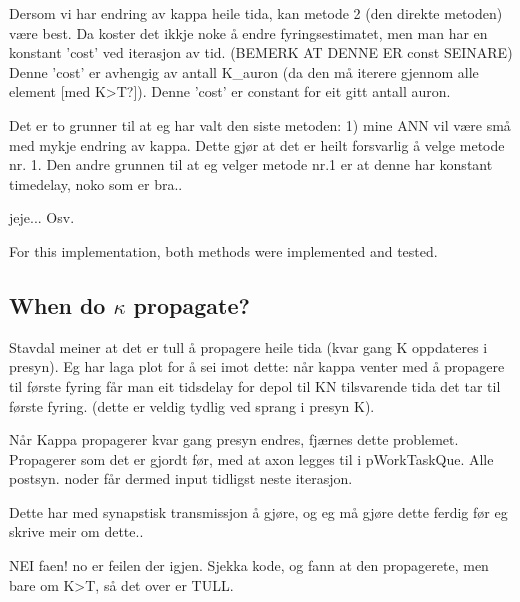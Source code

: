 	Dersom vi har endring av kappa heile tida, kan metode 2 (den direkte metoden) være best.
	Da koster det ikkje noke å endre fyringsestimatet, men man har en konstant 'cost' ved iterasjon av tid. (BEMERK AT DENNE ER const SEINARE)
	Denne 'cost' er avhengig av antall K\_auron (da den må iterere gjennom alle element [med K>T?]). Denne 'cost' er constant for eit gitt antall auron.

	Det er to grunner til at eg har valt den siste metoden: 1) mine ANN vil være små med mykje endring av kappa. Dette gjør at det er heilt forsvarlig å velge metode nr. 1.
	Den andre grunnen til at eg velger metode nr.1 er at denne har konstant timedelay, noko som er bra..

	jeje... Osv.

	For this implementation, both methods were implemented and tested. 












\subsection{When do $\kappa$ propagate?}
Stavdal meiner at det er tull å propagere heile tida (kvar gang K oppdateres i presyn). 
Eg har laga plot for å sei imot dette: når kappa venter med å propagere til første fyring får man eit tidsdelay for depol til KN tilsvarende tida det tar til første fyring. (dette er veldig tydlig ved sprang i presyn K).

Når Kappa propagerer kvar gang presyn endres, fjærnes dette problemet. Propagerer som det er gjordt før, med at axon legges til i pWorkTaskQue. Alle postsyn. noder får dermed input tidligst neste iterasjon.

Dette har med synapstisk transmissjon å gjøre, og eg må gjøre dette ferdig før eg skrive meir om dette..

NEI faen! no er feilen der igjen. Sjekka kode, og fann at den propagerete, men bare om K>T, så det over er TULL.







